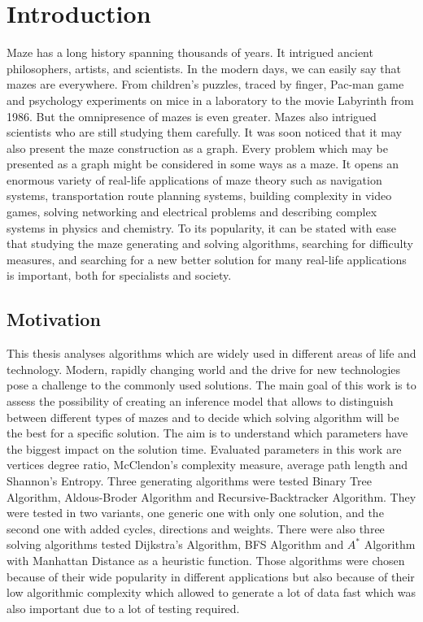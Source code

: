 \chapter{Introduction}\label{cha:Introduction}
Maze has a long history spanning thousands of years. It intrigued ancient philosophers, artists, and scientists. In the modern days, we can easily say
that mazes are everywhere. From children's puzzles, traced by finger, Pac-man game and psychology experiments on mice in a laboratory to the movie Labyrinth
from 1986. But the omnipresence of mazes is even greater. Mazes also intrigued scientists who are still studying them carefully. It was soon noticed that
it may also present the maze construction as a graph. Every problem which may be presented as a graph might be considered in some ways as a maze. It opens 
an enormous variety of real-life applications of maze theory such as navigation systems, transportation route planning systems, building complexity in video
games, solving networking and electrical problems and describing complex systems in physics and chemistry. To its popularity, it can be stated with ease that 
studying the maze generating and solving algorithms, searching for difficulty measures, and searching for a new better solution for many real-life applications
is important, both for specialists and society.
\section{Motivation}
This thesis analyses algorithms which are widely used in different areas of life and technology. Modern, rapidly changing world and the drive for
new technologies pose a challenge to the commonly used solutions. The main goal of this work is to assess the possibility of creating an inference model that allows
to distinguish between different types of mazes and to decide which solving algorithm will be the best for a specific solution. The aim is to understand which parameters
have the biggest impact on the solution time. Evaluated parameters in this work are vertices degree ratio, McClendon's complexity measure, average path length and Shannon's Entropy.
Three generating algorithms were tested Binary Tree Algorithm, Aldous-Broder Algorithm and Recursive-Backtracker Algorithm. They were tested in two variants, one generic one with only one solution, 
and the second one with added cycles, directions and weights. There were also three solving algorithms tested Dijkstra's Algorithm, BFS Algorithm and $A^*$ Algorithm 
with Manhattan Distance as a heuristic function. Those algorithms were chosen because of their wide popularity in different applications but also because of their low
algorithmic complexity which allowed to generate a lot of data fast which was also important due to a lot of testing required. 

